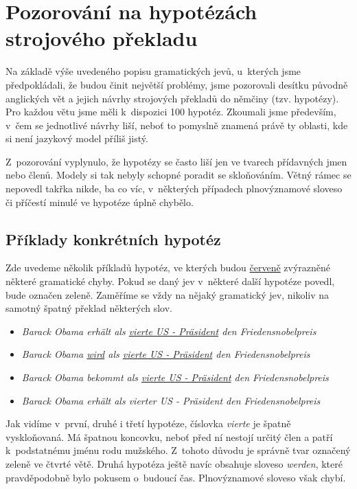 \documentclass[12pt,a4paper]{report}
\begin{document}
\section{Pozorování na hypotézách strojového překladu}
Na základě výše uvedeného popisu gramatických jevů, u~kterých jsme předpokládali, že budou činit největší problémy, jsme pozorovali desítku původně anglických vět a jejich návrhy strojových překladů do němčiny (tzv. hypotézy). Pro každou větu jsme měli k~dispozici 100 hypotéz. Zkoumali jsme především, v~čem se jednotlivé návrhy liší, neboť to pomyslně znamená právě ty oblasti, kde si není jazykový model příliš jistý.

Z~pozorování vyplynulo, že hypotézy se často liší jen ve tvarech přídavných jmen nebo členů. Modely si tak nebyly schopné poradit se skloňováním. Větný rámec se nepovedl takřka nikde, ba co víc, v~některých případech plnovýznamové sloveso či příčestí minulé ve hypotéze úplně chybělo.

\subsection{Příklady konkrétních hypotéz}

Zde uvedeme několik příkladů hypotéz, ve kterých budou \underline{\color{red}červeně} zvýrazněné některé gramatické chyby. Pokud se daný jev v~některé další hypotéze povedl, bude označen {\color{OliveGreen}zeleně}. Zaměříme se vždy na nějaký gramatický jev, nikoliv na samotný špatný překlad některých slov.

\begin{itemize}
\item{\textit{Barack Obama erhält als \underline{\color{red}vierte US - Präsident} den Friedensnobelpreis}}
\item{\textit{Barack Obama \underline{\color{red}wird} als \underline{\color{red}vierte US - Präsident} den Friedensnobelpreis}}
\item{\textit{Barack Obama bekommt als \underline{\color{red}vierte US - Präsident} den Friedensnobelpreis}} 
\item{\textit{Barack Obama erhält als {\color{OliveGreen}vierter US - Präsident} den Friedensnobelpreis}}
\end{itemize}

Jak vidíme v~první, druhé i třetí hypotéze, číslovka \textit{vierte} je špatně vyskloňovaná. Má špatnou koncovku, neboť před ní nestojí určitý člen a patří k~podstatnému jménu rodu mužského. Z~tohoto důvodu je správně tvar označený zeleně ve čtvrté větě. Druhá hypotéza ještě navíc obsahuje sloveso \textit{werden}, které pravděpodobně bylo pokusem o~budoucí čas. Plnovýznamové sloveso však chybí.
\end{document}
